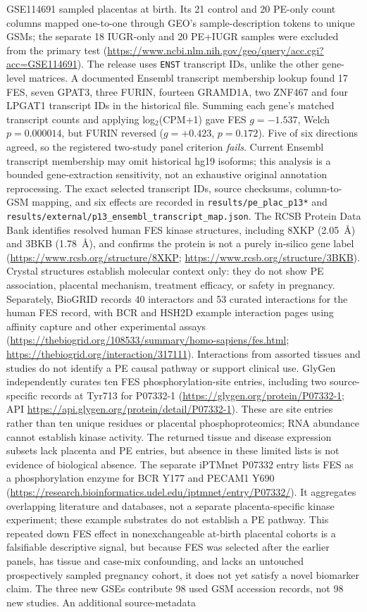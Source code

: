 \documentclass[11pt,a4paper]{article}
\begin{document}
GSE114691 sampled placentas at birth. Its 21 control and 20 PE-only count columns mapped one-to-one through GEO's sample-description tokens to unique GSMs; the separate 18 IUGR-only and 20 PE+IUGR samples were excluded from the primary test (\url{https://www.ncbi.nlm.nih.gov/geo/query/acc.cgi?acc=GSE114691}). The release uses \texttt{ENST} transcript IDs, unlike the other gene-level matrices. A documented Ensembl transcript membership lookup found 17 FES, seven GPAT3, three FURIN, fourteen GRAMD1A, two ZNF467 and four LPGAT1 transcript IDs in the historical file. Summing each gene's matched transcript counts and applying log$_2$(CPM+1) gave FES $g=-1.537$, Welch $p=0.000014$, but FURIN reversed ($g=+0.423$, $p=0.172$). Five of six directions agreed, so the registered two-study panel criterion \emph{fails}. Current Ensembl transcript membership may omit historical hg19 isoforms; this analysis is a bounded gene-extraction sensitivity, not an exhaustive original annotation reprocessing. The exact selected transcript IDs, source checksums, column-to-GSM mapping, and six effects are recorded in \texttt{results/pe\_plac\_p13*} and \texttt{results/external/p13\_ensembl\_transcript\_map.json}. The RCSB Protein Data Bank identifies resolved human FES kinase structures, including 8XKP (2.05~\AA) and 3BKB (1.78~\AA), and confirms the protein is not a purely in-silico gene label (\url{https://www.rcsb.org/structure/8XKP}; \url{https://www.rcsb.org/structure/3BKB}). Crystal structures establish molecular context only: they do not show PE association, placental mechanism, treatment efficacy, or safety in pregnancy. Separately, BioGRID records 40 interactors and 53 curated interactions for the human FES record, with BCR and HSH2D example interaction pages using affinity capture and other experimental assays (\url{https://thebiogrid.org/108533/summary/homo-sapiens/fes.html}; \url{https://thebiogrid.org/interaction/317111}). Interactions from assorted tissues and studies do not identify a PE causal pathway or support clinical use. GlyGen independently curates ten FES phosphorylation-site entries, including two source-specific records at Tyr713 for P07332-1 (\url{https://glygen.org/protein/P07332-1}; API \url{https://api.glygen.org/protein/detail/P07332-1}). These are site entries rather than ten unique residues or placental phosphoproteomics; RNA abundance cannot establish kinase activity. The returned tissue and disease expression subsets lack placenta and PE entries, but absence in these limited lists is not evidence of biological absence. The separate iPTMnet P07332 entry lists FES as a phosphorylation enzyme for BCR Y177 and PECAM1 Y690 (\url{https://research.bioinformatics.udel.edu/iptmnet/entry/P07332/}). It aggregates overlapping literature and databases, not a separate placenta-specific kinase experiment; these example substrates do not establish a PE pathway. This repeated down FES effect in nonexchangeable at-birth placental cohorts is a falsifiable descriptive signal, but because FES was selected after the earlier panels, has tissue and case-mix confounding, and lacks an untouched prospectively sampled pregnancy cohort, it does not yet satisfy a novel biomarker claim. The three new GSEs contribute 98 used GSM accession records, not 98 new studies. An additional source-metadata 
\end{document}
